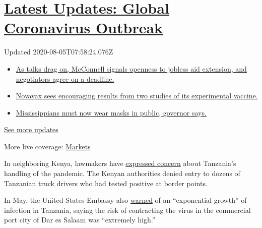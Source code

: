 \hypertarget{latest-updates-global-coronavirus-outbreak}{%
\section{\texorpdfstring{\href{https://www.nytimes.com/2020/08/04/world/coronavirus-cases.html?action=click\&pgtype=Article\&state=default\&region=MAIN_CONTENT_1\&context=storylines_live_updates}{Latest
Updates: Global Coronavirus
Outbreak}}{Latest Updates: Global Coronavirus Outbreak}}\label{latest-updates-global-coronavirus-outbreak}}

Updated 2020-08-05T07:58:24.076Z

\begin{itemize}
\tightlist
\item
  \href{https://www.nytimes.com/2020/08/04/world/coronavirus-cases.html?action=click\&pgtype=Article\&state=default\&region=MAIN_CONTENT_1\&context=storylines_live_updates\#link-762df92}{As
  talks drag on, McConnell signals openness to jobless aid extension,
  and negotiators agree on a deadline.}
\item
  \href{https://www.nytimes.com/2020/08/04/world/coronavirus-cases.html?action=click\&pgtype=Article\&state=default\&region=MAIN_CONTENT_1\&context=storylines_live_updates\#link-1228a480}{Novavax
  sees encouraging results from two studies of its experimental
  vaccine.}
\item
  \href{https://www.nytimes.com/2020/08/04/world/coronavirus-cases.html?action=click\&pgtype=Article\&state=default\&region=MAIN_CONTENT_1\&context=storylines_live_updates\#link-794484ed}{Mississippians
  must now wear masks in public, governor says.}
\end{itemize}

\href{https://www.nytimes.com/2020/08/04/world/coronavirus-cases.html?action=click\&pgtype=Article\&state=default\&region=MAIN_CONTENT_1\&context=storylines_live_updates}{See
more updates}

More live coverage:
\href{https://www.nytimes.com/live/2020/08/04/business/stock-market-today-coronavirus?action=click\&pgtype=Article\&state=default\&region=MAIN_CONTENT_1\&context=storylines_live_updates}{Markets}

In neighboring Kenya, lawmakers have
\href{https://www.youtube.com/watch?v=K1PeaFeAxGM}{expressed concern}
about Tanzania's handling of the pandemic. The Kenyan authorities denied
entry to dozens of Tanzanian truck drivers who had tested positive at
border points.

In May, the United States Embassy also
\href{https://tz.usembassy.gov/health-alert-u-s-embassy-dar-es-salaam-may-13-2020/}{warned}
of an ``exponential growth'' of infection in Tanzania, saying the risk
of contracting the virus in the commercial port city of Dar es Salaam
was ``extremely high.''

